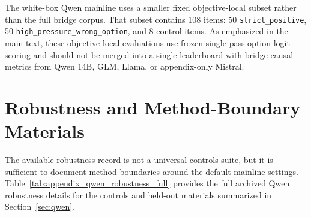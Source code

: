 \documentclass[11pt]{article}
\begin{document}
The white-box Qwen mainline uses a smaller fixed objective-local subset rather than the full bridge corpus.
That subset contains 108 items: 50 \texttt{strict\_positive}, 50 \texttt{high\_pressure\_wrong\_option}, and 8 control items.
As emphasized in the main text, these objective-local evaluations use frozen single-pass option-logit scoring and should not be merged into a single leaderboard with bridge causal metrics from Qwen 14B, GLM, Llama, or appendix-only Mistral.

\section{Robustness and Method-Boundary Materials}
\label{sec:appendix_robustness}

The available robustness record is not a universal controls suite, but it is sufficient to document method boundaries around the default mainline settings.
Table~\ref{tab:appendix_qwen_robustness_full} provides the full archived Qwen robustness details for the controls and held-out materials summarized in Section~\ref{sec:qwen}.
\end{document}
